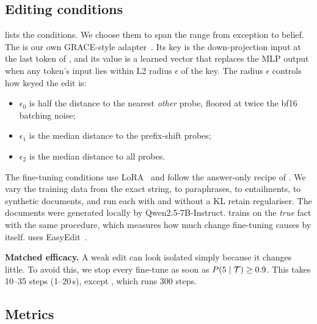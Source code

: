 

\subsection{Editing conditions}
\label{sec:conditions}

 lists the conditions. We choose them to span the range from exception to belief. The \codebook is our own GRACE-style adapter~\citep{hartvigsen2023grace}. Its key is the down-projection input at the last token of \setT, and its value is a learned vector that replaces the MLP output when any token's input lies within L2 radius $\epsilon$ of the key. The radius $\epsilon$ controls how keyed the edit is:
\begin{itemize}[leftmargin=*,itemsep=0pt,topsep=0pt]
    \item $\epsilon_0$ is half the distance to the nearest \emph{other} probe, floored at twice the bf16 batching noise;
    \item $\epsilon_1$ is the median distance to the prefix-shift probes;
    \item $\epsilon_2$ is the median distance to all \setE probes.
\end{itemize}
The fine-tuning conditions use LoRA~\citep{hu2022lora} and follow the answer-only recipe of \citet{gangadhar2024finetuning}. We vary the training data from the exact string, to paraphrases, to entailments, to synthetic documents, and run each with and without a KL retain regulariser. The \sdf documents were generated locally by Qwen2.5-7B-Instruct. \ftcontrol trains on the \emph{true} fact with the same procedure, which measures how much change fine-tuning causes by itself. \rome uses EasyEdit~\citep{wang2023easyedit}.

{\bf Matched efficacy.} A weak edit can look isolated simply because it changes little. To avoid this, we stop every fine-tune as soon as $P(\text{5}\mid\mathcal{T})\ge0.9$. This takes 10--35 steps (1--20\,s), except \sdfr, which runs 300 steps.



\subsection{Metrics}
\label{sec:metrics}

